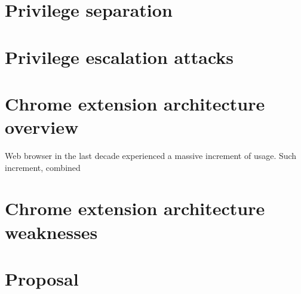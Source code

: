 \section{Privilege separation}
\label{sec:PriviSep}


\section{Privilege escalation attacks}
\label{sec:Escalation}

\section{Chrome extension architecture overview}
\label{sec:ExtOverview}
Web browser in the last decade experienced a massive increment of usage. Such increment, combined 

\section{Chrome extension architecture weaknesses}
\label{sec:ExtWeakness}

\section{Proposal}
\label{sec:Proposal}